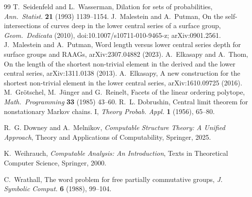 \documentclass[11pt]{article}
\theoremstyle{definition}\newtheorem{definition}[theorem]{Definition}\newtheorem{remark}[theorem]{Remark}\newtheorem{example}[theorem]{Example}\newtheorem{problem}[theorem]{Open problem}\crefname{problem}{Problem}{Problems}
\begin{document}
\begin{thebibliography}{99}
 T.~Seidenfeld and L.~Wasserman, Dilation for sets of probabilities, \emph{Ann.\ Statist.} \textbf{21} (1993) 1139--1154.
 J.~Malestein and A.~Putman, On the self-intersections of curves deep in the lower central series of a surface group, \emph{Geom.\ Dedicata} (2010), doi:10.1007/s10711-010-9465-z; arXiv:0901.2561.
 J.~Malestein and A.~Putman, Word length versus lower central series depth for surface groups and RAAGs, arXiv:2307.04882 (2023).
 A.~Elkasapy and A.~Thom, On the length of the shortest non-trivial element in the derived and the lower central series, arXiv:1311.0138 (2013).
 A.~Elkasapy, A new construction for the shortest non-trivial element in the lower central series, arXiv:1610.09725 (2016).
 M.~Gr\"otschel, M.~J\"unger and G.~Reinelt, Facets of the linear ordering polytope, \emph{Math.\ Programming} \textbf{33} (1985) 43--60.
R.~L. Dobrushin, Central limit theorem for nonstationary Markov chains. I, \emph{Theory Probab. Appl.} \textbf{1} (1956), 65--80.

R.~G. Downey and A.~Melnikov, \emph{Computable Structure Theory: A Unified Approach}, Theory and Applications of Computability, Springer, 2025.

K.~Weihrauch, \emph{Computable Analysis: An Introduction}, Texts in Theoretical Computer Science, Springer, 2000.

C.~Wrathall, The word problem for free partially commutative groups, \emph{J. Symbolic Comput.} \textbf{6} (1988), 99--104.


\end{thebibliography}
\end{document}
